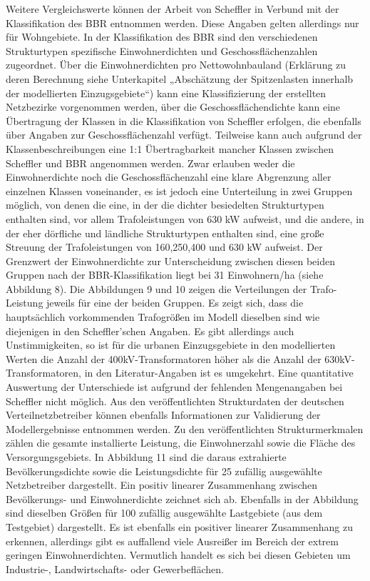 \documentclass[11pt]{scrreprt}
\begin{document}
Weitere Vergleichswerte können der Arbeit von Scheffler in Verbund mit der Klassifikation des BBR entnommen werden. Diese Angaben gelten allerdings nur für Wohngebiete. In der Klassifikation des BBR sind den verschiedenen Strukturtypen spezifische Einwohnerdichten und Geschossflächenzahlen zugeordnet. Über die Einwohnerdichten pro Nettowohnbauland (Erklärung zu deren Berechnung siehe Unterkapitel  „Abschätzung der Spitzenlasten innerhalb der modellierten Einzugsgebiete“) kann eine Klassifizierung der erstellten Netzbezirke vorgenommen werden, über die Geschossflächendichte kann eine Übertragung der Klassen in die Klassifikation von Scheffler erfolgen, die ebenfalls über Angaben zur Geschossflächenzahl verfügt. Teilweise kann auch aufgrund der Klassenbeschreibungen eine 1:1 Übertragbarkeit mancher Klassen zwischen Scheffler und BBR angenommen werden. Zwar erlauben weder die Einwohnerdichte noch die Geschossflächenzahl eine klare Abgrenzung aller einzelnen Klassen voneinander, es ist jedoch eine Unterteilung in zwei Gruppen möglich, von denen die eine, in der die dichter besiedelten Strukturtypen enthalten sind, vor allem Trafoleistungen von 630 kW aufweist, und die andere, in der eher dörfliche und ländliche Strukturtypen enthalten sind, eine große Streuung der Trafoleistungen von 160,250,400 und 630 kW aufweist. Der Grenzwert der Einwohnerdichte zur Unterscheidung zwischen diesen beiden Gruppen nach der BBR-Klassifikation liegt bei 31 Einwohnern/ha  (siehe Abbildung 8).
Die Abbildungen 9 und 10 zeigen die Verteilungen der Trafo-Leistung jeweils für eine der beiden Gruppen.  Es zeigt sich, dass die hauptsächlich vorkommenden Trafogrößen im Modell dieselben sind wie  diejenigen in den Scheffler’schen Angaben. Es gibt allerdings auch Unstimmigkeiten, so ist für die urbanen Einzugsgebiete  in den modellierten Werten die Anzahl der 400kV-Transformatoren höher als die Anzahl der 630kV-Transformatoren, in den Literatur-Angaben ist es umgekehrt. Eine quantitative Auswertung der Unterschiede ist aufgrund der fehlenden Mengenangaben bei Scheffler nicht möglich. Aus den veröffentlichten Strukturdaten der deutschen Verteilnetzbetreiber können ebenfalls Informationen zur Validierung der Modellergebnisse entnommen werden. Zu den veröffentlichten Strukturmerkmalen zählen die gesamte installierte Leistung, die Einwohnerzahl sowie die Fläche des Versorgungsgebiets. In Abbildung 11 sind die daraus extrahierte Bevölkerungsdichte sowie die Leistungsdichte für 25 zufällig ausgewählte Netzbetreiber dargestellt. Ein positiv linearer Zusammenhang zwischen Bevölkerungs- und Einwohnerdichte zeichnet sich ab. Ebenfalls in der Abbildung sind dieselben Größen für 100 zufällig ausgewählte Lastgebiete (aus dem Testgebiet) dargestellt. Es ist ebenfalls ein positiver linearer Zusammenhang zu erkennen, allerdings gibt es auffallend viele Ausreißer im Bereich der extrem geringen Einwohnerdichten. Vermutlich handelt es sich bei diesen Gebieten um Industrie-, Landwirtschafts- oder Gewerbeflächen.
\end{document}
